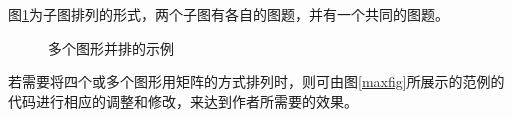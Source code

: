 图\ref{subfig1}为子图排列的形式，两个子图有各自的图题，并有一个共同的图题。

\begin{figure}
\begin{center}
    \hspace{7em}
    \caption{多个图形并排的示例}
    \label{subfig1}
\end{center}
\end{figure}

若需要将四个或多个图形用矩阵的方式排列时，则可由图\ref{maxfig}所展示的范例的
代码进行相应的调整和修改，来达到作者所需要的效果。

